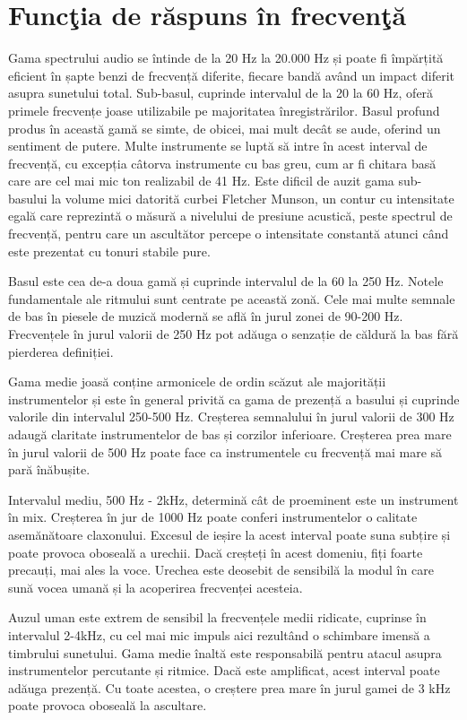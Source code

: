 	\section{Func\c{t}ia de r\u{a}spuns în frecven\c{t}\u{a}}
	
	Gama spectrului audio se întinde de la 20 Hz la 20.000 Hz și poate fi împărțită eficient în șapte benzi de frecvență diferite, fiecare bandă având un impact diferit asupra sunetului total. Sub-basul, cuprinde intervalul de la 20 la 60 Hz, oferă primele frecvențe joase utilizabile pe majoritatea înregistrărilor. Basul profund produs în această gamă se simte, de obicei, mai mult decât se aude, oferind un sentiment de putere. Multe instrumente se luptă să intre în acest interval de frecvență, cu excepția câtorva instrumente cu bas greu, cum ar fi chitara basă care are cel mai mic ton realizabil de 41 Hz. Este dificil de auzit gama sub-basului la volume mici datorită curbei Fletcher Munson, un contur cu intensitate egală care reprezintă o măsură a nivelului de presiune acustică, peste spectrul de frecvență, pentru care un ascultător percepe o intensitate constantă atunci când este prezentat cu tonuri stabile pure.
	
	Basul este cea de-a doua gamă și cuprinde intervalul de la 60 la 250 Hz. Notele fundamentale ale ritmului sunt centrate pe această zonă. Cele mai multe semnale de bas în piesele de muzică modernă se află în jurul zonei de 90-200 Hz. Frecvențele în jurul valorii de 250 Hz pot adăuga o senzație de căldură la bas fără pierderea definiției.
	
	Gama medie joasă conține armonicele de ordin scăzut ale majorității instrumentelor și este în general privită ca gama de prezență a basului și cuprinde valorile din intervalul 250-500 Hz. Creșterea semnalului în jurul valorii de 300 Hz adaugă claritate instrumentelor de bas și corzilor inferioare. Creșterea prea mare în jurul valorii de 500 Hz poate face ca instrumentele cu frecvență mai mare să pară înăbușite.
	
	Intervalul mediu, 500 Hz - 2kHz, determină cât de proeminent este un instrument în mix. Creșterea în jur de 1000 Hz poate conferi instrumentelor o calitate asemănătoare claxonului. Excesul de ieșire la acest interval poate suna subțire și poate provoca oboseală a urechii. Dacă creșteți în acest domeniu, fiți foarte precauți, mai ales la voce. Urechea este deosebit de sensibilă la modul în care sună vocea umană și la acoperirea frecvenței acesteia.
	
	Auzul uman este extrem de sensibil la frecvențele medii ridicate, cuprinse  în intervalul 2-4kHz, cu cel mai mic impuls aici rezultând o schimbare imensă a timbrului sunetului. Gama medie înaltă este responsabilă pentru atacul asupra instrumentelor percutante și ritmice. Dacă este amplificat, acest interval poate adăuga prezență. Cu toate acestea, o creștere prea mare în jurul gamei de 3 kHz poate provoca oboseală la ascultare.
	
